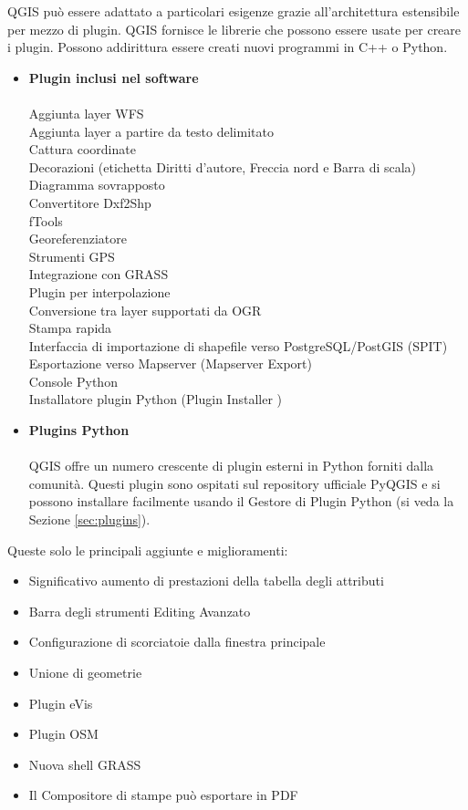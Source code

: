 QGIS può essere adattato a particolari esigenze grazie all'architettura
estensibile per mezzo di plugin. QGIS fornisce le librerie che possono
essere usate per creare i plugin. Possono addirittura essere creati
nuovi programmi in C++ o Python.

\begin{itemize}
\item \textbf{Plugin inclusi nel software}
\\ \\ Aggiunta layer WFS
\\ Aggiunta layer a partire da testo delimitato
\\ Cattura coordinate
\\ Decorazioni (etichetta Diritti d'autore, Freccia nord e Barra di scala)
\\ Diagramma sovrapposto
\\ Convertitore Dxf2Shp
\\ fTools
\\ Georeferenziatore
\\ Strumenti GPS
\\ Integrazione con GRASS
\\ Plugin per interpolazione
\\ Conversione tra layer supportati da OGR
\\ Stampa rapida
\\ Interfaccia di importazione di shapefile verso PostgreSQL/PostGIS (SPIT)
\\ Esportazione verso Mapserver (Mapserver Export)
\\ Console Python
\\ Installatore plugin Python (Plugin Installer )
\\ \item \textbf{Plugins Python}
\\ \\ QGIS offre un numero crescente di plugin esterni in Python forniti
dalla comunità. Questi plugin sono ospitati sul repository ufficiale
PyQGIS e si possono installare facilmente usando il Gestore di
Plugin Python (si veda la Sezione \ref{sec:plugins}).
\end{itemize}


Queste solo le principali aggiunte e miglioramenti:
\begin{itemize}
 \item Significativo aumento di prestazioni della tabella degli attributi
 \item Barra degli strumenti Editing Avanzato
 \item Configurazione di scorciatoie dalla finestra principale
 \item Unione di geometrie 
 \item Plugin eVis
 \item Plugin OSM 
 \item Nuova shell GRASS
 \item Il Compositore di stampe può esportare in PDF
\end{itemize}

